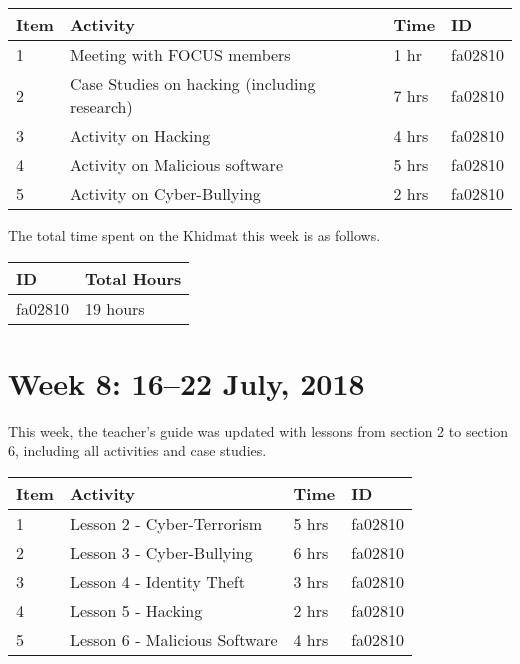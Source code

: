 \documentclass{article}
\begin{document}
\begin{tabular}{|l|l|l|l|}
  \hline
  Item 	& Activity & Time & ID \\\hline\hline
  1	& Meeting with FOCUS members & 1 hr & fa02810 \\\hline
  2	& Case Studies on hacking (including research) & 7 hrs & fa02810 \\\hline
  3 & Activity on Hacking & 4 hrs & fa02810 \\\hline
  4 & Activity on Malicious software & 5 hrs & fa02810 \\\hline
  5 & Activity on Cyber-Bullying & 2 hrs & fa02810 \\\hline
\end{tabular} \newline

The total time spent on the Khidmat this week is as follows. \newline

\begin{tabular}{|l|l|}
  \hline
  ID & Total Hours\\\hline\hline
  fa02810 & 19 hours\\\hline
\end{tabular}

\newpage %
\section*{Week 8: 16--22 July, 2018}

This week, the teacher's guide was updated with lessons from section 2 to section 6, including all activities and case studies. \newline

\begin{tabular}{|l|l|l|l|}
  \hline
  Item 	& Activity & Time & ID \\\hline\hline
  1	& Lesson 2 - Cyber-Terrorism & 5 hrs & fa02810 \\\hline
  2	& Lesson 3 - Cyber-Bullying & 6 hrs & fa02810 \\\hline
  3 & Lesson 4 - Identity Theft & 3 hrs & fa02810 \\\hline
  4 & Lesson 5 - Hacking & 2 hrs & fa02810 \\\hline
  5 & Lesson 6 - Malicious Software & 4 hrs & fa02810 \\\hline
\end{tabular} \newline
\end{document}
